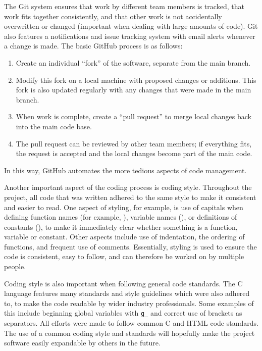 The Git system ensures that work by different team members is tracked\cite{github_contribs}, that work fits together consistently, and that other work is not accidentally overwritten or changed (important when dealing with large amounts of code). Git also features a notifications and issue tracking system with email alerts whenever a change is made. The basic GitHub process is as follows:

\begin{enumerate}
	\item Create an individual ``fork'' of the software, separate from the main branch.
	\item Modify this fork on a local machine with proposed changes or additions. This fork is also updated regularly with any changes that were made in the main branch.
	\item When work is complete, create a ``pull request'' to merge local changes back into the main code base.
	\item The pull request can be reviewed by other team members; if everything fits, the request is accepted and the local changes become part of the main code. 
\end{enumerate}
In this way, GitHub automates the more tedious aspects of code management.

Another important aspect of the coding process is coding style. Throughout the project, all code that was written adhered to the same style to make it consistent and easier to read. One aspect of styling, for example, is use of capitals when defining function names (for example, ), variable names (), or definitions of constants (), to make it immediately clear whether something is a function, variable or constant. Other aspects include use of indentation, the ordering of functions, and frequent use of comments. Essentially, styling is used to ensure the code is consistent, easy to follow, and can therefore be worked on by multiple people. 

Coding style is also important when following general code standards. The C language features many standards and style guidelines which were also adhered to, to make the code readable by wider industry professionals. Some examples of this include beginning global variables with \texttt{g_} and correct use of brackets as separators\cite{mellon}. All efforts were made to follow common C and HTML code standards. The use of a common coding style and standards will hopefully make the project software easily expandable by others in the future.



